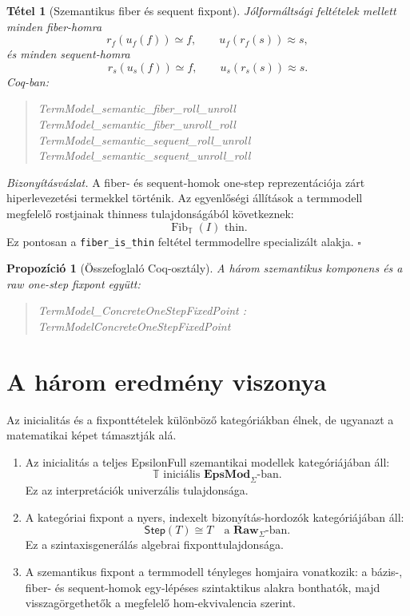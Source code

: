 \documentclass[11pt]{article}
\newtheorem{theorem}{Tétel}
\newtheorem{proposition}{Propozíció}
\newenvironment{proofsketch}
  {\par\noindent\textit{Bizonyításvázlat.}}
  {\hfill$\square$\par}
\newenvironment{coqblock}
  {\begin{quote}\small\ttfamily\obeylines}
  {\end{quote}}
\newcommand{\EpsMod}{\mathbf{EpsMod}_{\Sigma}}
\newcommand{\Raw}{\mathbf{Raw}_{\Sigma}}
\newcommand{\Step}{\mathsf{Step}}
\newcommand{\TM}{\mathbb{T}}
\newcommand{\Fib}{\operatorname{Fib}}
\begin{document}
\begin{theorem}[Szemantikus fiber és sequent fixpont]
Jólformáltsági feltételek mellett minden fiber-homra
\[
  r_f(u_f(f))\simeq f,
  \qquad
  u_f(r_f(s))\approx s,
\]
és minden sequent-homra
\[
  r_s(u_s(f))\simeq f,
  \qquad
  u_s(r_s(s))\approx s.
\]
Coq-ban:
\begin{coqblock}
TermModel\_semantic\_fiber\_roll\_unroll
TermModel\_semantic\_fiber\_unroll\_roll
TermModel\_semantic\_sequent\_roll\_unroll
TermModel\_semantic\_sequent\_unroll\_roll
\end{coqblock}
\end{theorem}

\begin{proofsketch}
A fiber- és sequent-homok one-step reprezentációja zárt hiperlevezetési
termekkel történik. Az egyenlőségi állítások a termmodell megfelelő
rostjainak thinness tulajdonságából következnek:
\[
  \Fib_{\TM}(I)\text{ thin}.
\]
Ez pontosan a \texttt{fiber\_is\_thin} feltétel termmodellre specializált
alakja.
\end{proofsketch}

\begin{proposition}[Összefoglaló Coq-osztály]
A három szemantikus komponens és a raw one-step fixpont együtt:
\begin{coqblock}
TermModel\_ConcreteOneStepFixedPoint :
  TermModelConcreteOneStepFixedPoint
\end{coqblock}
\end{proposition}

\section{A három eredmény viszonya}

Az inicialitás és a fixponttételek különböző kategóriákban élnek, de ugyanazt
a matematikai képet támasztják alá.

\begin{enumerate}
\item Az inicialitás a teljes EpsilonFull szemantikai modellek kategóriájában
áll:
\[
  \TM \text{ iniciális } \EpsMod\text{-ban}.
\]
Ez az interpretációk univerzális tulajdonsága.

\item A kategóriai fixpont a nyers, indexelt bizonyítás-hordozók
kategóriájában áll:
\[
  \Step(T)\cong T \quad \text{a }\Raw\text{-ban}.
\]
Ez a szintaxisgenerálás algebrai fixponttulajdonsága.

\item A szemantikus fixpont a termmodell tényleges homjaira vonatkozik:
a bázis-, fiber- és sequent-homok egy-lépéses szintaktikus alakra bonthatók,
majd visszagörgethetők a megfelelő hom-ekvivalencia szerint.
\end{enumerate}
\end{document}

